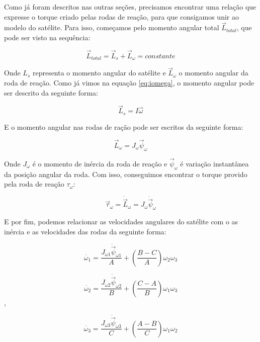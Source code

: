 Como já foram descritos nas outras seções, precisamos encontrar uma relação que expresse o torque criado pelas rodas de reação, para que consigamos unir ao modelo do satélite. Para isso, começamos pelo momento angular total $\vec{L}_{total}$, que pode ser visto na sequência:

\begin{equation}\label{eq:ltot}
\vec{L}_{total}=\vec{L}_s+\vec{L}_{\omega}=constante 
\end{equation}

Onde $L_s$ representa o momento angular do satélite e $\vec{L}_{\omega}$ o momento angular da roda de reação. Como já vimos na equação \ref{eq:iomega}, o momento angular pode ser descrito da seguinte forma:

\begin{equation}
\vec{L}_s=I\vec{\omega}
\end{equation}

E o momento angular nas rodas de ração pode ser escritos da seguinte forma:

\begin{equation}
\vec {L}_{\omega} =J_{\omega}\vec{\psi}_{\omega}
\end{equation}

Onde $J_{\omega}$ é o momento de inércia da roda de reação e $\vec{\psi}_{\omega}$ é variação instantânea da posição angular da roda. Com isso, conseguimos encontrar o torque provido pela roda de reação $\tau_{\omega}$:

\begin{equation}\label{eq:torqueedo}
\vec{\tau}_{\omega}=\dot{\vec{L}}_{\omega}=J_{\omega}\dot{\vec{\psi}}_{\omega}
\end{equation}

E por fim, podemos relacionar as velocidades angulares do satélite com o as inércia e as velocidades das rodas da seguinte forma:

\begin{equation}\label{eq:modeloA}
  \dot{\omega_{1}}=\frac{J_{\omega 1}\dot{\vec{\psi}}_{\omega 1}}{A}+\left(\frac{B-C}{A}\right)\omega_{2}\omega_{3}
\end{equation}

\begin{equation}\label{eq:modeloB}
  \dot{\omega_{2}}=\frac{J_{\omega 2}\dot{\vec{\psi}}_{\omega 2}}{B}+\left(\frac{C-A}{B}\right)\omega_{1}\omega_{3}
\end{equation},

\begin{equation}\label{eq:modeloC}
  \dot{\omega_{3}}=\frac{J_{\omega 3}\dot{\vec{\psi}}_{\omega 3}}{C}+\left(\frac{A-B}{C}\right)\omega_{1}\omega_{2}
\end{equation}

